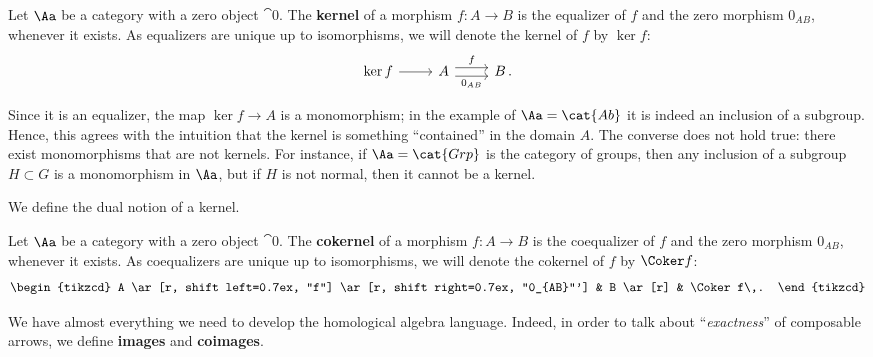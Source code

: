 \begin{df}
    Let $\Aa$ be a category with a zero object $\cat{0}$.
    The \textbf{kernel} of a morphism $f : A \to B$
    is the equalizer of $f$ and the zero morphism $0_{AB}$,
    whenever it exists. As equalizers are unique up to isomorphisms,
    we will denote the kernel of $f$ by $\ker f$:
    \begin{equation*}
    \begin{tikzcd}
        \ker f \ar[r]
        & A \ar[r, shift left=0.7ex, "f"] \ar[r, shift right=0.7ex, "0_{AB}"']
        & B\,.
    \end{tikzcd}
\end{equation*}
\end{df}

\begin{rmk}
    Since it is an equalizer, the map $\ker f \to A$ is a 
    monomorphism; in the example of $\Aa = \cat{Ab}$ it
    is indeed an inclusion of a subgroup. Hence, this agrees
    with the intuition that the kernel is something
    ``contained'' in the domain $A$. 
    The converse does not hold true: there exist
    monomorphisms that are not kernels. For instance,
    if $\Aa = \cat{Grp}$ is the category of groups,
    then any inclusion of a subgroup $H \subset G$ is
    a monomorphism in $\Aa$, but if $H$ is not normal,
    then it cannot be a kernel.
\end{rmk}

We define the dual notion of a kernel.

\begin{df}
    Let $\Aa$ be a category with a zero object $\cat{0}$.
    The \textbf{cokernel} of a morphism $f : A \to B$
    is the coequalizer of $f$ and the zero morphism $0_{AB}$,
    whenever it exists. As coequalizers are unique up to isomorphisms,
    we will denote the cokernel of $f$ by $\Coker f$:
    \begin{equation*}
    \begin{tikzcd}
        A \ar[r, shift left=0.7ex, "f"] \ar[r, shift right=0.7ex, "0_{AB}"']
        & B \ar[r] & \Coker f\,.
    \end{tikzcd}
\end{equation*}
\end{df}

We have almost everything we need to develop
the homological algebra language. Indeed, in order
to talk about ``\emph{exactness}'' of
composable arrows, 
we define \textbf{images} and \textbf{coimages}.

